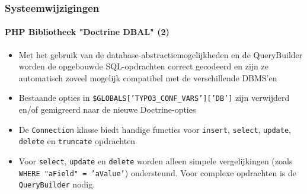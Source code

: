 \begin{frame}[fragile]
	\frametitle{Systeemwijzigingen}
	\framesubtitle{PHP Bibliotheek "Doctrine DBAL" (2)}

	\begin{itemize}

		\item Met het gebruik van de database-abstractiemogelijkheden en de QueryBuilder
		 	worden de opgebouwde SQL-opdrachten correct gecodeerd en zijn ze automatisch
		 	zoveel mogelijk compatibel met de verschillende DBMS'en

		\item Bestaande opties in \texttt{\$GLOBALS['TYPO3\_CONF\_VARS']['DB']} zijn
			verwijderd en/of gemigreerd naar de nieuwe Doctrine-opties

		\item De \texttt{Connection} klasse biedt handige functies voor
			\texttt{insert}, \texttt{select}, \texttt{update}, \texttt{delete} en
			\texttt{truncate} opdrachten

		\item Voor \texttt{select}, \texttt{update} en \texttt{delete} worden alleen simpele
			vergelijkingen (zoals \texttt{WHERE "aField" = 'aValue'}) ondersteund.
			Voor complexe opdrachten is de \texttt{QueryBuilder} nodig.

	\end{itemize}

\end{frame}

